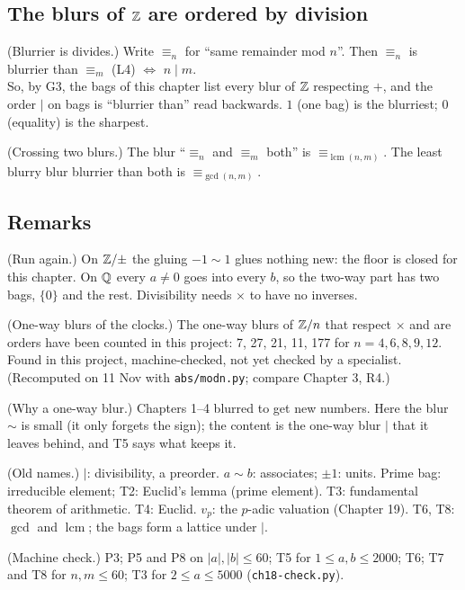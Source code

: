 \subsection*{The blurs of $\mathbb{Z}$ are ordered by division}

\begin{lines}
\item[\lab{T7}] (Blurrier is divides.) Write $\equiv_n$ for ``same remainder mod $n$''. Then $\equiv_n$ is blurrier than $\equiv_m$ (L4) $\iff$ $n \mid m$. \\
So, by G3, the bags of this chapter list every blur of $\mathbb{Z}$ respecting $+$, and the order $\mid$ on bags is ``blurrier than'' read backwards. $1$ (one bag) is the blurriest; $0$ (equality) is the sharpest.
\item[\lab{T8}] (Crossing two blurs.) The blur ``$\equiv_n$ and $\equiv_m$ both'' is $\equiv_{\operatorname{lcm}(n,m)}$. The least blurry blur blurrier than both is $\equiv_{\gcd(n,m)}$.
\end{lines}

\subsection*{Remarks}

\begin{lines}
\item[\lab{R1}] (Run again.) On $\mathbb{Z}/{\pm}$ the gluing $-1 \sim 1$ glues nothing new: the floor is closed for this chapter. On $\mathbb{Q}$ every $a \neq 0$ goes into every $b$, so the two-way part has two bags, $\{0\}$ and the rest. Divisibility needs $\times$ to have no inverses.
\item[\lab{R2}] (One-way blurs of the clocks.) The one-way blurs of $\mathbb{Z}/n$ that respect $\times$ and are orders have been counted in this project: 7, 27, 21, 11, 177 for $n = 4, 6, 8, 9, 12$. Found in this project, machine-checked, not yet checked by a specialist. (Recomputed on 11 Nov with \texttt{abs/modn.py}; compare Chapter 3, R4.)
\item[\lab{R3}] (Why a one-way blur.) Chapters 1--4 blurred to get new numbers. Here the blur $\sim$ is small (it only forgets the sign); the content is the one-way blur $\mid$ that it leaves behind, and T5 says what keeps it.
\item[\lab{R4}] (Old names.) $\mid$: divisibility, a preorder. $a \sim b$: associates; $\pm 1$: units. Prime bag: irreducible element; T2: Euclid's lemma (prime element). T3: fundamental theorem of arithmetic. T4: Euclid. $v_p$: the $p$-adic valuation (Chapter 19). T6, T8: $\gcd$ and $\operatorname{lcm}$; the bags form a lattice under $\mid$.
\item[\lab{R5}] (Machine check.) P3; P5 and P8 on $|a|, |b| \le 60$; T5 for $1 \le a, b \le 2000$; T6; T7 and T8 for $n, m \le 60$; T3 for $2 \le a \le 5000$ (\texttt{ch18-check.py}).
\end{lines}


